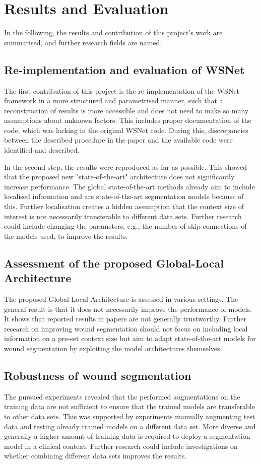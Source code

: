 \section{Results and Evaluation}

In the following, the results and contribution of this project's work are summarised, and further research fields are named.

\subsection{Re-implementation and evaluation of WSNet}

The first contribution of this project is the re-implementation of the WSNet framework in a more structured and parametrised manner, such that a reconstruction of results is more accessible and does not need to make so many assumptions about unknown factors. This includes proper documentation of the code, which was lacking in the original WSNet code. During this, discrepancies between the described procedure in the paper and the available code were identified and described.

In the second step, the results were reproduced as far as possible. This showed that the proposed new "state-of-the-art" architecture does not significantly increase performance. The global state-of-the-art methods already aim to include localised information and are state-of-the-art segmentation models because of this. Further localisation creates a hidden assumption that the context size of interest is not necessarily transferable to different data sets. Further research could include changing the parameters, e.g., the number of skip connections of the models used, to improve the results.

\subsection{Assessment of the proposed Global-Local Architecture}

The proposed Global-Local Architecture is assessed in various settings. The general result is that it does not necessarily improve the performance of models. It shows that reported results in papers are not generally trustworthy. Further research on improving wound segmentation should not focus on including local information on a pre-set context size but aim to adapt state-of-the-art models for wound segmentation by exploiting the model architectures themselves.

\subsection{Robustness of wound segmentation}

The pursued experiments revealed that the performed augmentations on the training data are not sufficient to ensure that the trained models are transferable to other data sets. This was supported by experiments manually augmenting test data and testing already trained models on a different data set. More diverse and generally a higher amount of training data is required to deploy a segmentation model in a clinical context. Further research could include investigations on whether combining different data sets improves the results.